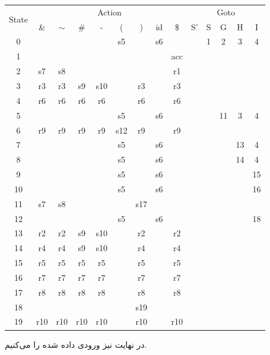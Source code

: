 \documentclass[]{article}
\begin{document}
\begin{latin}
    \centering
    \begin{tabular}{|c|c|c|c|c|c|c|c|c|c|c|c|c|c|}
        \hline
        \multirow{2}{*}{State} & \multicolumn{8}{|c|}{Action} & \multicolumn{5}{|c|}{Goto}\\
        \cline{2-14}
        &\&&$\sim$&\#&-&(&)&id&\$&S'&S&G&H&I\\
        \hline
        0& & & & &s5& &s6& & &1&2&3&4\\
        \hline
        1& & & & & & & &acc& & & & & \\
        \hline
        2&s7&s8& & & & & &r1& & & & & \\
        \hline
3&r3&r3&s9&s10& &r3& &r3& & & & & \\
\hline
4&r6&r6&r6&r6& &r6& &r6& & & & & \\
\hline
5& & & & &s5& &s6& & & &11&3&4\\
\hline
6&r9&r9&r9&r9&s12&r9& &r9& & & & & \\
\hline
7& & & & &s5& &s6& & & & &13&4\\
\hline
8& & & & &s5& &s6& & & & &14&4\\
\hline
9& & & & &s5& &s6& & & & & &15\\
\hline
10& & & & &s5& &s6& & & & & &16\\
\hline
11&s7&s8& & & &s17& & & & & & & \\
\hline
12& & & & &s5& &s6& & & & & &18\\
\hline
13&r2&r2&s9&s10& &r2& &r2& & & & & \\
\hline
14&r4&r4&s9&s10& &r4& &r4& & & & & \\
\hline
15&r5&r5&r5&r5& &r5& &r5& & & & & \\
\hline
16&r7&r7&r7&r7& &r7& &r7& & & & & \\
\hline
17&r8&r8&r8&r8& &r8& &r8& & & & & \\
\hline
18& & & & & &s19& & & & & & & \\
\hline
19&r10&r10&r10&r10& &r10& &r10& & & & & \\
\hline
    \end{tabular}
\end{latin}
در نهایت نیز ورودی داده شده را
    می‌کنیم.
\end{document}
